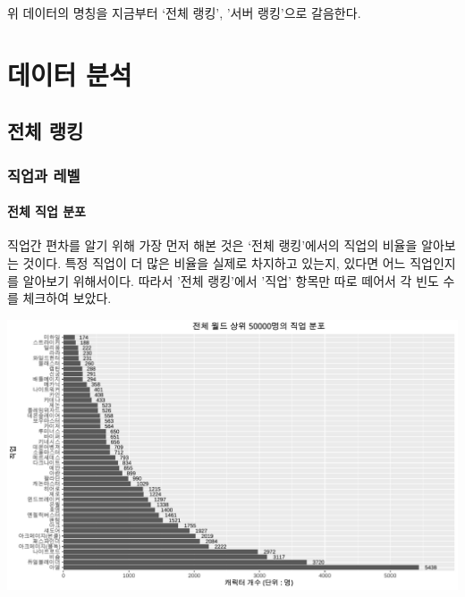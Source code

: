 \documentclass[
]{article}
\begin{document}
위 데이터의 명칭을 지금부터 `전체 랭킹', '서버 랭킹'으로 갈음한다.

\hypertarget{uxb370uxc774uxd130-uxbd84uxc11d}{%
\section{데이터 분석}\label{uxb370uxc774uxd130-uxbd84uxc11d}}

\hypertarget{uxc804uxccb4-uxb7aduxd0b9}{%
\subsection{전체 랭킹}\label{uxc804uxccb4-uxb7aduxd0b9}}

\hypertarget{uxc9c1uxc5c5uxacfc-uxb808uxbca8}{%
\subsubsection{직업과 레벨}\label{uxc9c1uxc5c5uxacfc-uxb808uxbca8}}

\hypertarget{uxc804uxccb4-uxc9c1uxc5c5-uxbd84uxd3ec}{%
\paragraph{전체 직업
분포}\label{uxc804uxccb4-uxc9c1uxc5c5-uxbd84uxd3ec}}

직업간 편차를 알기 위해 가장 먼저 해본 것은 `전체 랭킹'에서의 직업의
비율을 알아보는 것이다. 특정 직업이 더 많은 비율을 실제로 차지하고
있는지, 있다면 어느 직업인지를 알아보기 위해서이다. 따라서 '전체
랭킹'에서 '직업' 항목만 따로 떼어서 각 빈도 수를 체크하여 보았다.

\includegraphics{123_files/figure-latex/ranking_all_job-1.pdf}
\end{document}
